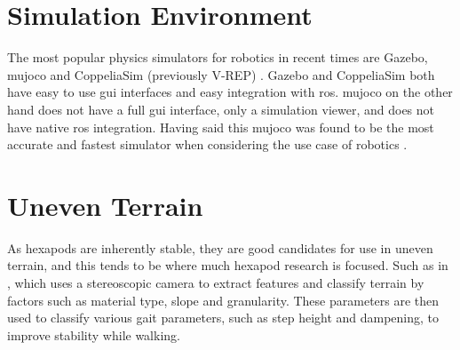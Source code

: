 



\section{Simulation Environment}

The most popular physics simulators for robotics in recent times are Gazebo, \ac{mujoco} and CoppeliaSim (previously V-REP) \citep{Collins-2021}.
Gazebo and CoppeliaSim both have easy to use \ac{gui} interfaces and easy integration with \ac{ros}. \ac{mujoco} on the other hand does not have
a full \ac{gui} interface, only a simulation viewer, and does not have native \ac{ros} integration. Having said this \ac{mujoco} was found to be
the most accurate and fastest simulator when considering the use case of robotics \citep{Erez-2015}.

\section{Uneven Terrain}
    As hexapods are inherently stable, they are good candidates for use in uneven terrain, and this tends to be where much hexapod research is focused.
    Such as in \cite{homberger2017terrain}, which uses a stereoscopic camera to extract features and classify terrain by factors such as material type,
    slope and granularity. These parameters are then used to classify various gait parameters, such as step height and dampening, to improve stability while
    walking.

